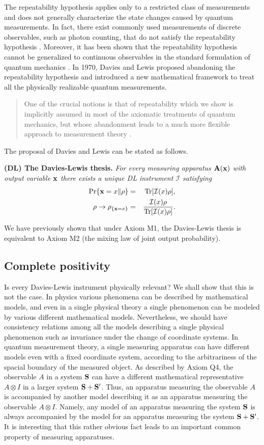\documentclass[graybox]{svmult}
\newcommand{\beqa}{\begin{eqnarray}}
\newcommand{\eeqa}{\end{eqnarray}}
\newcommand{\bA}{{\bf A}}
\newcommand{\bS}{{\bf S}}
\newcommand{\cI}{{\mathcal I}}
\newcommand{\rh}{\rho}
\newcommand{\Tr}{\mbox{\rm Tr}}
\newcommand{\bx}{{\bf x}}
\begin{document}
The repeatability hypothesis applies only to a restricted class of measurements 
and does not generally characterize the state changes caused 
by quantum measurements.
In fact, there exist commonly used measurements of discrete observables,
such as photon counting, that do not satisfy the repeatability hypothesis \cite{IUO90}.
Moreover,  it has been shown that the repeatability hypothesis cannot be generalized 
to continuous observables in the standard formulation of quantum mechanics
\cite{84QC,85CA,Sri80,88MR}.
In 1970, Davies and Lewis \cite{DL70} proposed abandoning the repeatability
hypothesis and introduced a new mathematical framework to treat 
all the physically realizable quantum measurements.
\begin{quote}
One of the crucial notions is that of repeatability which we show is implicitly
assumed in most of the axiomatic treatments of quantum mechanics, but whose
abandonment leads to a much more flexible approach to measurement theory
\cite[p.~239]{DL70}.
\end{quote}

The proposal of Davies and Lewis \cite{DL70} can be stated as follows.
\bigskip

{\bf  (DL) The Davies-Lewis thesis.}
{\em For every measuring apparatus $\bA(\bx)$ with output variable $\bx$ 
there exists  a unique DL instrument
$\cI$ satisfying
\beqa
\Pr\{\bx=x\|\rh\}&=&\Tr[\cI(x)\rh],\\
\rh\to\rh_{\{\bx=x\}}&=&
\frac{\cI(x)\rh}{\Tr[\cI(x)\rh]}.
\eeqa}
\bigskip

We have previously shown that under Axiom M1, the Davies-Lewis thesis is 
equivalent to Axiom M2 (the mixing law of joint output probability).

\subsection{Complete positivity}

Is every Davies-Lewis instrument physically relevant?
We shall show that this is not the case.
In physics various phenomena can be described by mathematical models,
and even in a single physical theory a single phenomenon can be modeled
by various different mathematical models.   
Nevertheless, we should have consistency relations among all the models
describing a single physical phenomenon such as invariance under the 
change of coordinate systems.
In quantum measurement theory, a single measuring apparatus can have
different models even with a fixed coordinate system, according to the
arbitrariness of the spacial boundary of the measured object.
As described by Axiom Q4, the observable $A$ in a system $\bS$ can 
have a different mathematical representative $A\otimes I$ in a larger system
$\bS+\bS'$.
Thus, an apparatus measuring the observable $A$ is accompanied by another model
describing it as an apparatus measuring the observable $A\otimes I$.
Namely, any model of an apparatus measuring the system $\bS$ is always  accompanied
by the model for an apparatus measuring the system $\bS+\bS'$.
It is interesting that this rather obvious fact leads to an important common 
property of measuring apparatuses.
\bigskip
\end{document}
